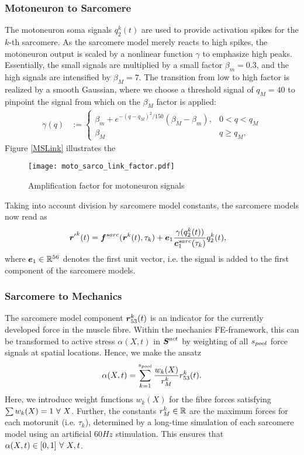 \subsubsection{Motoneuron to Sarcomere}
The motoneuron soma signals $q^k_2(t)$ are used to provide activation spikes for the $k$-th sarcomere.
As the sarcomere model merely reacts to high spikes, the motoneuron output is scaled by a nonlinear function $\gamma$ to emphasize high peaks.
Essentially, the small signals are multiplied by a small factor $\beta_m = 0.3$, and the high signals are intensified by $\beta_M = 7$.
The transition from low to high factor is realized by a smooth Gaussian,
where we choose a threshold signal of $q_M = 40$ to pinpoint the signal from which on the $\beta_M$ factor is applied:
\begin{align}
	\gamma(q) &:= \begin{cases}
		\beta_m + e^{-(q-q_M)^2/150}(\beta_M-\beta_m), & 0 < q < q_M\\
		\beta_M & q \geq q_M,
	\end{cases}
\end{align}
Figure \ref{MSLink} illustrates the 
\begin{figure}[!ht]
	\centering
	\texttt{[image: moto\_sarco\_link\_factor.pdf]}
	\caption{Amplification factor for motoneuron signals}
	\label{fig:MSLink}
\end{figure}
Taking into account division by sarcomere model constants, the sarcomere models now read as
\begin{align}
	{\boldsymbol{r}'}^k(t) &= \boldsymbol{f}^{sarc}(\boldsymbol{r}^k(t),\tau_k) + \boldsymbol{e}_1 \frac{\gamma(q_2^k(t))}{\boldsymbol{c}^{sarc}_1(\tau_k)}q_2^k(t),
\end{align}
where $\boldsymbol{e}_1 \in \mathbb{R}^{56}$ denotes the first unit vector, i.e. the signal is added to the first component of the sarcomere models.

\subsubsection{Sarcomere to Mechanics}
The sarcomere model component $\boldsymbol{r}_{53}^k(t)$ is an indicator for the currently developed force in the muscle fibre.
Within the mechanics FE-framework, this can be transformed to active stress $\alpha(X,t)$ in $\boldsymbol{S}^{act}$ by weighting of all ${s_{pool}}$ force signals at spatial locations.
Hence, we make the ansatz
\begin{align}
	\alpha(X,t) = \sum\limits_{k=1}^{s_{pool}} \frac{w_k(X)}{r^k_M} r^k_{53}(t).
\end{align}
Here, we introduce weight functions $w_k(X)$ for the fibre forces satisfying $\sum w_k(X) = 1 ~\forall~ X$.
Further, the constants $r^k_M\in\mathbb{R}$ are the maximum forces for each motorunit (i.e. $\tau_k$), determined by a long-time simulation of each sarcomere model using an
artificial $60Hz$ stimulation.
This ensures that $\alpha(X,t) \in [0,1] ~\forall~ X,t$. 

